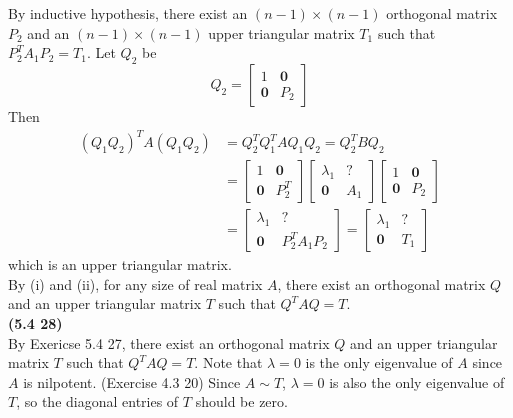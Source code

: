 By inductive hypothesis, there exist an $(n-1) \times (n-1)$ orthogonal matrix $P_2$ and an $(n-1) \times (n-1)$ upper triangular matrix $T_1$ such that $P_2^TA_1P_2 = T_1$. Let $Q_2$ be \begin{equation*}
	Q_2 = \begin{bmatrix}
		1 & \textbf{0} \\ \textbf{0} & P_2
	\end{bmatrix}
\end{equation*} Then \begin{align*}
	(Q_1Q_2)^TA(Q_1Q_2) &= Q_2^TQ_1^TAQ_1Q_2 = Q_2^TBQ_2 \\
	&= \begin{bmatrix}
		1 & \textbf{0} \\ \textbf{0} & P_2^T
	\end{bmatrix}\begin{bmatrix}
		\lambda_1 & ? \\ \textbf{0} & A_1
	\end{bmatrix}\begin{bmatrix}
		1 & \textbf{0} \\ \textbf{0} & P_2
	\end{bmatrix} \\
	&= \begin{bmatrix}
		\lambda_1 & ? \\ \textbf{0} & P_2^TA_1P_2
	\end{bmatrix} = \begin{bmatrix}
		\lambda_1 & ? \\ \textbf{0} & T_1
	\end{bmatrix}
\end{align*} which is an upper triangular matrix. \\

By (i) and (ii), for any size of real matrix $A$, there exist an orthogonal matrix $Q$ and an upper triangular matrix $T$ such that $Q^TAQ = T$. \\

\textbf{(5.4 28)} \\
By Exericse 5.4 27, there exist an orthogonal matrix $Q$ and an upper triangular matrix $T$ such that $Q^TAQ = T$. Note that $\lambda = 0$ is the only eigenvalue of $A$ since $A$ is nilpotent. (Exercise 4.3 20) Since $A \sim T$, $\lambda = 0$ is also the only eigenvalue of $T$, so the diagonal entries of $T$ should be zero.
\fi